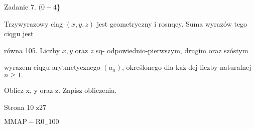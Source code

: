 \documentclass[a4paper,12pt]{article}
\begin{document}
Zadanie 7. $(0-4$\}

Trzywyrazowy ciag $(x,y,z)$ jest geometryczny i rosnqcy. Suma wyrazów tego ciqgu jest

równa 105. Liczby $x, y$ oraz $z$ sq- odpowiednio-pierwszym, drugim oraz szóstym

wyrazem ciqgu arytmetycznego $(a_{n})$, określonego dla $\mathrm{k}\mathrm{a}\dot{\mathrm{z}}$ dej liczby naturalnej $n\geq 1.$

Oblicz x, y oraz z. Zapisz obliczenia.

Strona 10 z27

$\mathrm{M}\mathrm{M}\mathrm{A}\mathrm{P}-\mathrm{R}0_{-}100$
\end{document}
